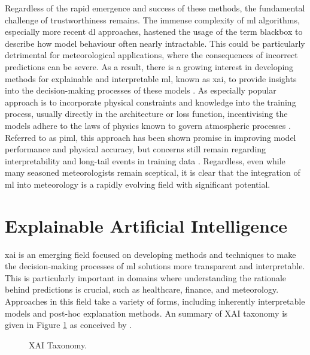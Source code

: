 Regardless of the rapid emergence and success of these methods, the fundamental challenge of trustworthiness remains. The immense complexity of \acrshort{ml} algorithms, especially more recent \acrshort{dl} approaches, hastened the usage of the term \gls{blackbox} to describe how model behaviour often nearly intractable. This could be particularly detrimental for meteorological applications, where the consequences of incorrect predictions can be severe. As a result, there is a growing interest in developing methods for explainable and interpretable \acrshort{ml}, known as \acrfull{xai}, to provide insights into the decision-making processes of these models \citep{Molnar2025}. As especially popular approach is to incorporate physical constraints and knowledge into the training process, usually directly in the architecture or loss function, incentivising the models adhere to the laws of physics known to govern atmospheric processes \citep{Dabrowski2020,Chen2022,Luo2025,Zhang2023}. Referred to as \acrfull{piml}, this approach has been shown promise in improving model performance and physical accuracy, but concerns still remain regarding interpretability and long-tail events in training data \citep{Sun2025}. Regardless, even while many seasoned meteorologists remain sceptical, it is clear that the integration of \acrshort{ml} into meteorology is a rapidly evolving field with significant potential.

\section{Explainable Artificial Intelligence}

\acrfull{xai} is an emerging field focused on developing methods and techniques to make the decision-making processes of \acrshort{ml} solutions more transparent and interpretable. This is particularly important in domains where understanding the rationale behind predictions is crucial, such as healthcare, finance, and meteorology. Approaches in this field take a variety of forms, including inherently interpretable models and post-hoc explanation methods. An summary of XAI taxonomy is given in Figure \ref{fig:xai-taxonomy} as conceived by \citep{Molnar2025}.

\begin{figure}[h]
    \centering
    \caption{XAI Taxonomy.}
    \label{fig:xai-taxonomy}
\end{figure}

